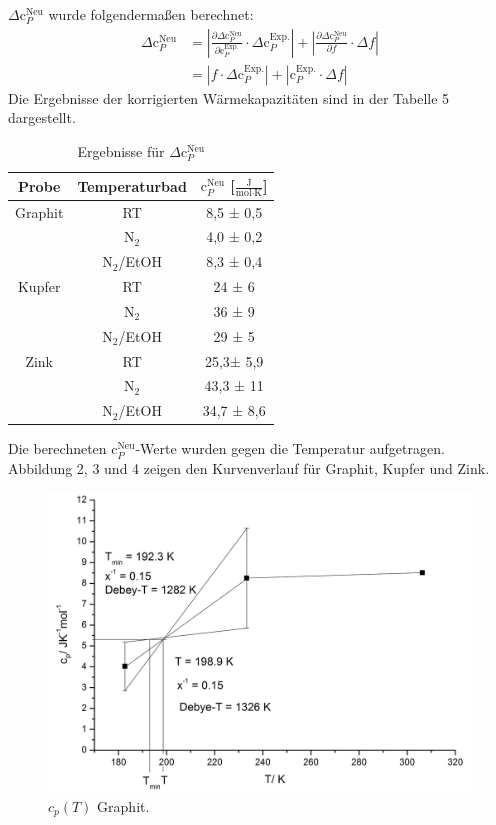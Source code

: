 \documentclass[12pt,a4paper,titlepage,headinclude,bibtotoc]{scrartcl}
\begin{document}
$\Delta\text{c}_P^{\text{Neu}}$ wurde folgendermaßen berechnet:
\begin{align}
\Delta\text{c}_P^{\text{Neu}}&= |\frac{\partial\Delta\text{c}_P^{\text{Neu}}}{\partial \text{c}_P^{\text{Exp.}}} \cdot \Delta\text{c}_P^{\text{Exp.}} |+ |\frac{\partial\Delta\text{c}_P^{\text{Neu}}}{\partial f} \cdot \Delta f|\\
&=| f \cdot \Delta\text{c}_P^{\text{Exp.}}| + |\text{c}_P^{\text{Exp.}} \cdot \Delta f |
\end{align} 
Die Ergebnisse der korrigierten Wärmekapazitäten sind in der Tabelle 5 dargestellt.
\begin{table}[h!]
\centering
\caption{Ergebnisse für $\Delta\text{c}_P^{\text{Neu}}$}
\begin{tabular}{c|c|c}
Probe&Temperaturbad&$\text{c}_P^{\text{Neu}}$ [$\frac{\text{J}}{\text{mol}\cdot\text{K}}$]\\
\hline
Graphit& RT&8,5 ± 0,5 \\
\hline
&$\text{N}_2$&4,0 ± 0,2 \\
\hline
&$\text{N}_2$/EtOH&8,3 ± 0,4 \\
\hline
Kupfer &RT& 24 ± 6\\
\hline
&$\text{N}_2$& 36 ± 9\\
\hline
&$\text{N}_2$/EtOH& 29 ± 5\\
\hline
Zink &RT&25,3± 5,9\\
\hline
&$\text{N}_2$&43,3 ± 11\\
\hline
&$\text{N}_2$/EtOH& 34,7 ± 8,6\\
\end{tabular}
\end{table}
\FloatBarrier
Die berechneten $\text{c}_P^{\text{Neu}}$-Werte wurden gegen die Temperatur aufgetragen. Abbildung 2, 3 und 4 zeigen den Kurvenverlauf für Graphit, Kupfer und Zink.
\begin{figure} [h!]
\centering
\includegraphics[width=13.5cm]{Grap_Deb.jpeg}
\caption{$c_p(T)$ Graphit.}
\end{figure} 
\FloatBarrier
\end{document}
